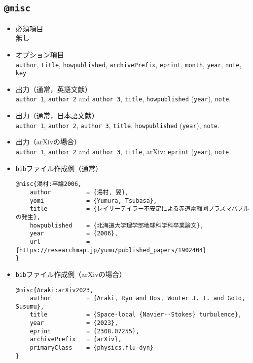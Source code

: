 \documentclass[a4paper,fleqn,uplatex,dvipdfmx]{jsarticle}
\makeatletter
\newcommand{\ttmisc}{\texttt{@misc}}
\makeatother
\begin{document}
\subsection{\ttmisc}
\label{ssec:misc}
\begin{screen}
    \begin{itemize}
        \item 必須項目 \\
        無し
        \item オプション項目 \\
        \verb|author|, \verb|title|, \verb|howpublished|, \verb|archivePrefix|, \verb|eprint|, \verb|month|, \verb|year|, \verb|note|, \verb|key|
        \item 出力（通常，英語文献） \\
            \colorbox[gray]{0.8}{\texttt{author 1}}, \colorbox[gray]{0.8}{\texttt{author 2}} and \colorbox[gray]{0.8}{\texttt{author 3}}, \colorbox[gray]{0.8}{\texttt{title}}, \colorbox[gray]{0.8}{\texttt{howpublished}} (\colorbox[gray]{0.8}{\texttt{year}}), \colorbox[gray]{0.8}{\texttt{note}}.
        \item 出力（通常，日本語文献） \\
            \colorbox[gray]{0.8}{\texttt{author 1}}, \colorbox[gray]{0.8}{\texttt{author 2}}, \colorbox[gray]{0.8}{\texttt{author 3}}, \colorbox[gray]{0.8}{\texttt{title}}, \colorbox[gray]{0.8}{\texttt{howpublished}} (\colorbox[gray]{0.8}{\texttt{year}}), \colorbox[gray]{0.8}{\texttt{note}}.
        \item 出力（arXivの場合） \\
            \colorbox[gray]{0.8}{\texttt{author 1}}, \colorbox[gray]{0.8}{\texttt{author 2}} and \colorbox[gray]{0.8}{\texttt{author 3}}, \colorbox[gray]{0.8}{\texttt{title}}, arXiv: \colorbox[gray]{0.8}{\texttt{eprint}} (\colorbox[gray]{0.8}{\texttt{year}}), \colorbox[gray]{0.8}{\texttt{note}}.
        \item \verb|bib|ファイル作成例（通常） \vspace{-3mm}
\begin{verbatim}
@misc{湯村:卒論2006,
    author          = {湯村, 翼},
    yomi            = {Yumura, Tsubasa},
    title           = {レイリーテイラー不安定による赤道電離圏プラズマバブルの発生},
    howpublished    = {北海道大学理学部地球科学科卒業論文},
    year            = {2006},
    url             = {https://researchmap.jp/yumu/published_papers/1902404}
}
\end{verbatim}
        \item \verb|bib|ファイル作成例（arXivの場合） \vspace{-3mm}
\begin{verbatim}
@misc{Araki:arXiv2023,
    author          = {Araki, Ryo and Bos, Wouter J. T. and Goto, Susumu},
    title           = {Space-local {Navier--Stokes} turbulence}, 
    year            = {2023},
    eprint          = {2308.07255},
    archivePrefix   = {arXiv},
    primaryClass    = {physics.flu-dyn}
}
\end{verbatim}
    \end{itemize}
\end{screen}
\end{document}
